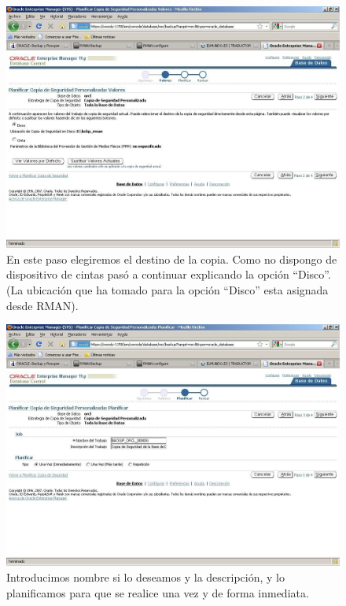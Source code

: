 \begin{figure}[h]
\includegraphics[width=1\textwidth]{../images/backupEM-4.jpg}
\caption{En este paso elegiremos el destino de la copia. Como no dispongo de dispositivo de cintas pasó a continuar explicando la opción “Disco”. (La ubicación que ha tomado para la opción “Disco” esta asignada desde RMAN).}
\label{fig:bear}
\end{figure}

\begin{figure}[h]
\includegraphics[width=1\textwidth]{../images/backupEM-5.jpg}
\caption{Introducimos nombre si lo deseamos y la descripción, y lo planificamos para que se realice una vez y de forma inmediata.}
\label{fig:bear}
\end{figure}

